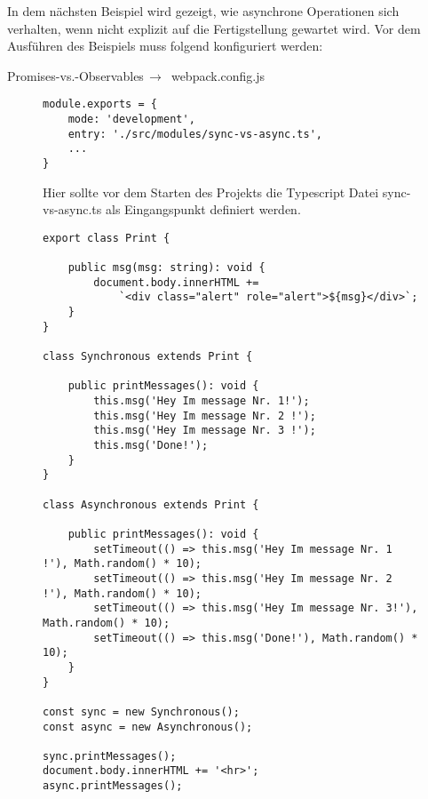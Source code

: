 In dem nächsten Beispiel wird gezeigt, wie asynchrone Operationen sich verhalten, wenn nicht explizit auf die Fertigstellung gewartet wird. Vor dem Ausführen des Beispiels muss folgend konfiguriert werden:

\begin{center}
    Promises-vs.-Observables$\,\to\,$ webpack.config.js
\end{center}

\begin{figure}[H]
\begin{lstlisting}
module.exports = {
    mode: 'development',
    entry: './src/modules/sync-vs-async.ts',
    ...
}
\end{lstlisting}
\caption{Hier sollte vor dem Starten des Projekts die Typescript Datei sync-vs-async.ts als Eingangspunkt definiert werden.}
\end{figure}

\begin{figure}[H]
\begin{lstlisting}
export class Print {

    public msg(msg: string): void {
        document.body.innerHTML +=
            `<div class="alert" role="alert">${msg}</div>`;
    }
}

class Synchronous extends Print {

    public printMessages(): void {
        this.msg('Hey Im message Nr. 1!');
        this.msg('Hey Im message Nr. 2 !');
        this.msg('Hey Im message Nr. 3 !');
        this.msg('Done!');
    }
}

class Asynchronous extends Print {

    public printMessages(): void {
        setTimeout(() => this.msg('Hey Im message Nr. 1 !'), Math.random() * 10);
        setTimeout(() => this.msg('Hey Im message Nr. 2 !'), Math.random() * 10);
        setTimeout(() => this.msg('Hey Im message Nr. 3!'), Math.random() * 10);
        setTimeout(() => this.msg('Done!'), Math.random() * 10);
    }
}

const sync = new Synchronous();
const async = new Asynchronous();

sync.printMessages();
document.body.innerHTML += '<hr>';
async.printMessages();
\end{lstlisting}
\end{figure}

